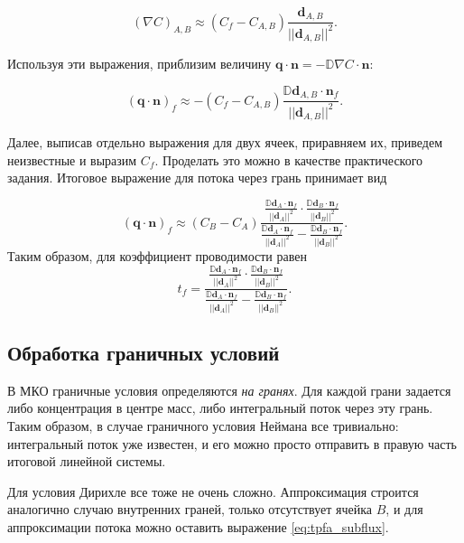 \documentclass[a4paper, 11pt]{article}
\begin{document}
\begin{equation}
\left(\nabla C\right) _{A,B}
\approx
(C_f - C_{A,B}) \frac{\mathbf{d}_{A,B}}{||\mathbf{d}_{A,B}||^2}.
\end{equation}

Используя эти выражения, приблизим величину $\mathbf{q}\cdot \mathbf{n} = -\mathbb{D} \nabla C \cdot \mathbf{n}$:

\begin{equation}\label{eq:tpfa_subflux}
\left(
\mathbf{q}\cdot \mathbf{n}\right)_f
\approx
-(C_f - C_{A,B}) \frac{\mathbb{D}\mathbf{d}_{A,B}\cdot\mathbf{n}_f}{||\mathbf{d}_{A,B}||^2}.
\end{equation}

Далее, выписав отдельно выражения для двух ячеек, приравняем их, приведем неизвестные и выразим $C_f$. Проделать это можно в качестве практического задания. Итоговое выражение для потока через грань принимает вид

\begin{equation}
\left(
\mathbf{q}\cdot \mathbf{n}\right)_f
\approx
(C_B - C_A)
\frac
{
\frac{\mathbb{D}\mathbf{d}_A\cdot\mathbf{n}_f}{||\mathbf{d}_A||^2}
\cdot
\frac{\mathbb{D}\mathbf{d}_B\cdot\mathbf{n}_f}{||\mathbf{d}_B||^2}
}
{
\frac{\mathbb{D}\mathbf{d}_A\cdot\mathbf{n}_f}{||\mathbf{d}_A||^2}
-
\frac{\mathbb{D}\mathbf{d}_B\cdot\mathbf{n}_f}{||\mathbf{d}_B||^2}
}.
\end{equation}
Таким образом, для коэффициент проводимости равен
\begin{equation}\label{eq:tpfa_trans}
t_f = 
\frac
{
	\frac{\mathbb{D}\mathbf{d}_A\cdot\mathbf{n}_f}{||\mathbf{d}_A||^2}
	\cdot
	\frac{\mathbb{D}\mathbf{d}_B\cdot\mathbf{n}_f}{||\mathbf{d}_B||^2}
}
{
	\frac{\mathbb{D}\mathbf{d}_A\cdot\mathbf{n}_f}{||\mathbf{d}_A||^2}
	-
	\frac{\mathbb{D}\mathbf{d}_B\cdot\mathbf{n}_f}{||\mathbf{d}_B||^2}
}.
\end{equation}

\subsection{Обработка граничных условий}
В МКО граничные условия определяются \textit{на гранях}. Для каждой грани задается либо концентрация в центре масс, либо интегральный поток через эту грань. Таким образом, в случае граничного условия Неймана все тривиально: интегральный поток уже известен, и его можно просто отправить в правую часть итоговой линейной системы. 

Для условия Дирихле все тоже не очень сложно. Аппроксимация строится аналогично случаю внутренних граней, только отсутствует ячейка $B$, и для аппроксимации потока можно оставить выражение \eqref{eq:tpfa_subflux}.
\end{document}
